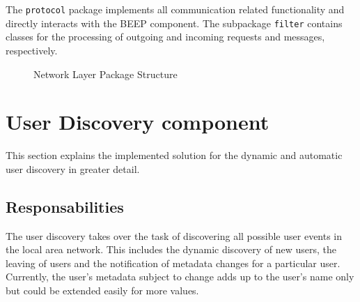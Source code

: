 The \texttt{protocol} package implements all communication related functionality and directly interacts with the BEEP component. The subpackage \texttt{filter} contains classes for the processing of outgoing and incoming requests and messages, respectively.

\begin{figure}[htb]
 \centering
 \caption{Network Layer Package Structure}
 \label{fig:network.architecture}
\end{figure}


\section{User Discovery component}
This section explains the implemented solution for the dynamic and automatic user discovery in greater detail.

\subsection{Responsabilities}
The user discovery takes over the task of discovering all possible user events in the local area network. This includes the dynamic discovery of new users, the leaving of users and the notification of metadata changes for a particular user. Currently, the user's metadata subject to change adds up to the user's name only but could be extended easily for more values.

